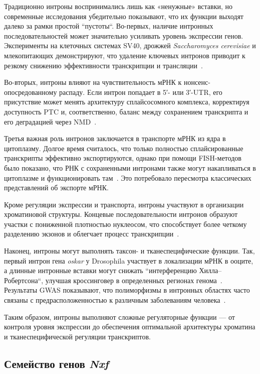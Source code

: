 Традиционно интроны воспринимались лишь как «ненужные» вставки, но современные исследования убедительно показывают, что их функции выходят далеко за рамки простой ``пустоты``.
Во-первых, наличие интронных последовательностей может значительно усиливать уровень экспрессии генов.
Эксперименты на клеточных системах SV40, дрожжей \textit{Saccharomyces cerevisiae} и млекопитающих демонстрируют, что удаление ключевых интронов приводит к резкому снижению эффективности транскрипции и трансляции~\cite{Gruss1979,Juneau2006}.

Во-вторых, интроны влияют на чувствительность мРНК к нонсенс-опосредованному распаду.
Если интрон попадает в 5′- или 3′-UTR, его присутствие может менять архитектуру сплайсосомного комплекса, корректируя доступность PTC и, соответственно, баланс между сохранением транскрипта и его деградацией через NMD~\cite{Jo2015,Kalyna2012}.

Третья важная роль интронов заключается в транспорте мРНК из ядра в цитоплазму.
Долгое время считалось, что только полностью сплайсированные транскрипты эффективно экспортируются, однако при помощи FISH-методов было показано, что РНК с сохраненными интронами также могут накапливаться в цитоплазме и функционировать там~\cite{Valencia2008,Jo2015}.
Это потребовало пересмотра классических представлений об экспорте мРНК.

Кроме регуляции экспрессии и транспорта, интроны участвуют в организации хроматиновой структуры.
Концевые последовательности интронов образуют участки с пониженной плотностью нуклеосом, что способствует более четкому разделению экзонов и облегчает процесс транскрипции~\cite{Schwartz2009}.

Наконец, интроны могут выполнять таксон- и тканеспецифические функции.
Так, первый интрон гена \textit{oskar} у Drosophila участвует в локализации мРНК в ооците, а длинные интронные вставки могут снижать ``интерференцию Хилла–Робертсона``, улучшая кроссинговер в определенных регионах генома~\cite{Comeron2008}.
Результаты GWAS показывают, что полиморфизмы в интронных областях часто связаны с предрасположенностью к различным заболеваниям человека~\cite{Welter2014}.

Таким образом, интроны выполняют сложные регуляторные функции — от контроля уровня экспрессии до обеспечения оптимальной архитектуры хроматина и тканеспецифической регуляции транскриптов.


\subsection{Семейство генов \textit{Nxf}}

